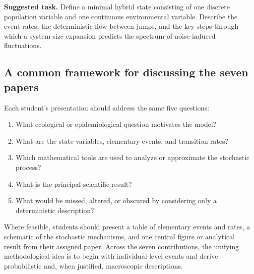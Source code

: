 \noindent\textbf{Suggested task.} Define a minimal hybrid state consisting
of one discrete population variable and one continuous environmental
variable. Describe the event rates, the deterministic flow between jumps,
and the key steps through which a system-size expansion predicts the
spectrum of noise-induced fluctuations.

\subsection{A common framework for discussing the seven papers}
\label{subsec:common-framework}

Each student's presentation should address the same five questions:
\begin{enumerate}
  \item What ecological or epidemiological question motivates the model?
  \item What are the state variables, elementary events, and transition rates?
  \item Which mathematical tools are used to analyze or approximate the
        stochastic process?
  \item What is the principal scientific result?
  \item What would be missed, altered, or obscured by considering only a
        deterministic description?
\end{enumerate}

Where feasible, students should present a table of elementary events and
rates, a schematic of the stochastic mechanisms, and one central figure or
analytical result from their assigned paper. Across the seven contributions,
the unifying methodological idea is to begin with individual-level events
and derive probabilistic and, when justified, macroscopic descriptions.
